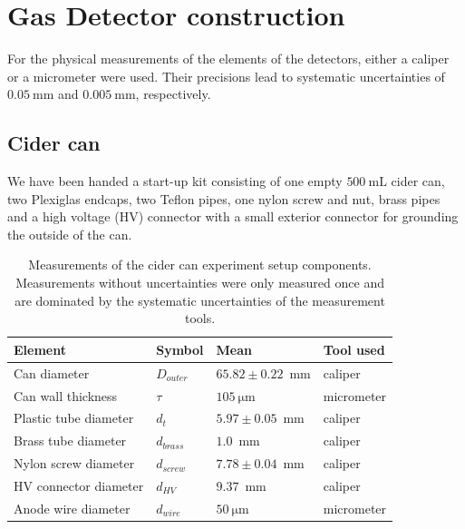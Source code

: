 \section{Gas Detector construction}
\label{sec:construction}

For the physical measurements of the elements of the detectors, either a caliper or a micrometer were used. Their precisions lead to systematic uncertainties of $\SI{0.05}{\milli\meter}$ and $\SI{0.005}{\milli\meter}$, respectively.

\subsection{Cider can}
We have been handed a start-up kit consisting of one empty $\SI{500}{\milli\liter}$
cider can, two Plexiglas endcaps, two Teflon pipes, one nylon screw and nut,
brass pipes and a high voltage (HV) connector with a small exterior connector for
grounding the outside of the can.

\begin{table}[htb]%
  \begin{tabularx}{\linewidth}{p{4cm}p{1.5cm}p{3cm}p{2cm}}
    \textbf{Element}       & \textbf{Symbol} & \textbf{Mean}            & \textbf{Tool used} \\ \hline
    Can diameter           & $D_{outer}$     & $65.82 \pm 0.22$~mm      & caliper            \\
    Can wall thickness     & $\tau$          & $\SI{105}{\micro\meter}$ & micrometer         \\
    Plastic tube diameter  & $d_{t}$         & $5.97 \pm 0.05$~mm       & caliper            \\
    Brass tube diameter    & $d_{brass}$     & $1.0$~mm                 & caliper            \\
    Nylon screw diameter   & $d_{screw}$     & $7.78 \pm 0.04$~mm       & caliper            \\
    HV connector diameter  & $d_{HV}$        & $9.37$~mm                & caliper            \\
    Anode wire diameter    & $d_{wire}$      & $\SI{50}{\micro\meter}$  & micrometer         \\ \hline
  \end{tabularx}
  \caption{Measurements of the cider can experiment setup components. Measurements without uncertainties were only measured once and are dominated by the systematic uncertainties of the measurement tools.}
  \label{Tab:cidercan_sizes}
\end{table}


